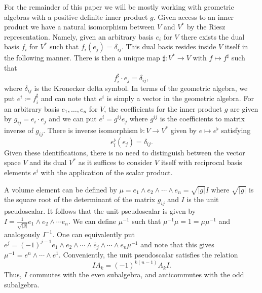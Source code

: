 For the remainder of this paper we will be mostly working with geometric algebras with a positive definite inner product $g$. Given access to an inner product we have a natural isomorphism between $V$ and $V^*$ by the Riesz representation.  Namely, given an arbitrary basis $e_i$ for $V$ there exists the dual basis $f_i$ for $V^*$ such that $f_i(e_j)=\delta_{ij}$.  This dual basis resides inside $V$ itself in the following manner. There is then a unique map $\sharp \colon V^* \to V$ with $f\mapsto f^\sharp$ such that
\[
f_i^\sharp \cdot e_j = \delta_{ij},
\]
where $\delta_{ij}$ is the Kronecker delta symbol. In terms of the geometric algebra, we put $e^i \coloneqq f_i^\sharp$ and can note that $e^i$ is simply a vector in the geometric algebra. For an arbitrary basis $e_1,\dots,e_n$ for $V$, the coefficients for the inner product $g$ are given by $g_{ij}=e_i\cdot e_j$ and we can put $e^i = g^{ij}e_j$ where $g^{ij}$ is the coefficients to matrix inverse of $g_{ij}$.  There is inverse isomorphism $\flat \colon V \to V^*$ given by $e \mapsto e^\flat$ satisfying
\[
e_i^\flat (e_j)= \delta_{ij}.
\]
Given these identifications, there is no need to distinguish between the vector space $V$ and its dual $V^*$ as it suffices to consider $V$ itself with reciprocal basis elements $e^i$ with the application of the scalar product.

A volume element can be defined by $\mu=e_1 \wedge e_2 \wedge \cdots \wedge e_n = \sqrt{|g|} I$ where $\sqrt{|g|}$ is the square root of the determinant of the matrix $g_{ij}$ and $I$ is the unit pseudoscalar. It follows that the unit pseudoscalar is given by $I=\frac{1}{\sqrt{|g|}} e_1 \wedge e_2 \wedge \cdots e_n$. We can define $\mu^{-1}$ such that $\mu^{-1}\mu = 1 = \mu \mu^{-1}$ and analogously $I^{-1}$.  One can equivalently put $e^j = (-1)^{j-1} e_1 \wedge e_2 \wedge \cdots \wedge \breve{e_j} \wedge \cdots \wedge e_n \mu^{-1}$ and note that this gives $\mu^{-1} = e^n \wedge \cdots \wedge e^1$.  Conveniently, the unit pseudoscalar satisfies the relation
\[
IA_k = (-1)^{k(n-1)} A_k I.
\]
Thus, $I$ commutes with the even subalgebra, and anticommutes with the odd subalgebra.  

